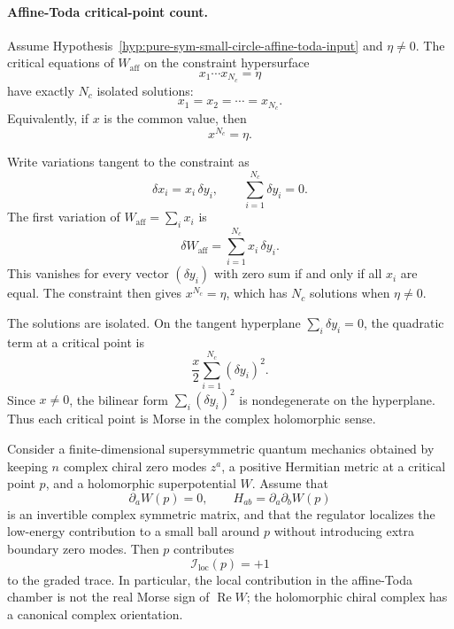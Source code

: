 \paragraph{Affine-Toda critical-point count.}
Assume Hypothesis~\ref{hyp:pure-sym-small-circle-affine-toda-input} and
\(\eta\neq0\).  The critical equations of \(W_{\mathrm{aff}}\) on the
constraint hypersurface
\[
  x_1\cdots x_{N_c}=\eta
\]
have exactly \(N_c\) isolated solutions:
\[
  x_1=x_2=\cdots=x_{N_c}.
\]
Equivalently, if \(x\) is the common value, then
\[
  x^{N_c}=\eta .
\]

Write variations tangent to the constraint as
\[
  \delta x_i=x_i\,\delta y_i,
  \qquad
  \sum_{i=1}^{N_c}\delta y_i=0 .
\]
The first variation of \(W_{\mathrm{aff}}=\sum_i x_i\) is
\[
  \delta W_{\mathrm{aff}}
  =
  \sum_{i=1}^{N_c}x_i\,\delta y_i .
\]
This vanishes for every vector \((\delta y_i)\) with zero sum if and only if
all \(x_i\) are equal.  The constraint then gives \(x^{N_c}=\eta\), which has
\(N_c\) solutions when \(\eta\neq0\).

The solutions are isolated.  On the tangent hyperplane
\(\sum_i\delta y_i=0\), the quadratic term at a critical point is
\[
  \frac{x}{2}\sum_{i=1}^{N_c}(\delta y_i)^2 .
\]
Since \(x\neq0\), the bilinear form \(\sum_i(\delta y_i)^2\) is
nondegenerate on the hyperplane.  Thus each critical point is Morse in the
complex holomorphic sense.

\begin{proposition}
\label{prop:pure-sym-local-chiral-critical-index}
Consider a finite-dimensional supersymmetric quantum mechanics obtained by
keeping \(n\) complex chiral zero modes \(z^a\), a positive Hermitian metric
at a critical point \(p\), and a holomorphic superpotential \(W\).  Assume
that
\[
  \partial_a W(p)=0,
  \qquad
  H_{ab}=\partial_a\partial_bW(p)
\]
is an invertible complex symmetric matrix, and that the regulator localizes
the low-energy contribution to a small ball around \(p\) without introducing
extra boundary zero modes.  Then \(p\) contributes
\[
  \mathcal I_{\mathrm{loc}}(p)=+1
\]
to the graded trace.  In particular, the local contribution in the
affine-Toda chamber is not the real Morse sign of \(\operatorname{Re}W\);
the holomorphic chiral complex has a canonical complex orientation.
\end{proposition}


